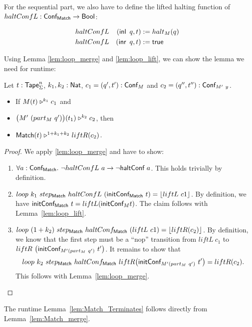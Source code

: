 For the sequential part, we also have to define the lifted halting function of \\$haltConfL : \textsf{Conf}_{\textsf{Match}} \rightarrow \textsf{Bool}$:
\begin{definition}
  \begin{alignat*}{2}
    & haltConfL & (\operatorname{\textsf{inl}}~q, t) &:= halt_M(q) \\
    & haltConfL & (\operatorname{\textsf{inr}}~q, t) &:= \textsf{true}
  \end{alignat*}
\end{definition}

Using Lemma \ref{lem:loop_merge} and \ref{lem:loop_lift}, we can show the lemma we need for runtime:
\begin{lemma}
  \label{lem:Match_merge}
  Let $t : \textsf{Tape}_\Sigma^n$, $k_1, k_2:\textsf{Nat}$, $c_1=(q', t') : \textsf{Conf}_M$ and $c_2=(q'', t'') : \textsf{Conf}_{M'~y}$.
  \begin{itemize}
  \item If $M(t) \mathrel{\triangleright}^{k_1} c_1$ and
  \item $\bigl( M'~(part_M~q') \bigr) (t_1) \mathrel{\triangleright}^{k_2} c_2$, then
  \item $\textsf{Match}(t) \mathrel{\triangleright}^{1+k_1+k_2} liftR(c_2)$.
  \end{itemize}
\end{lemma}
\begin{proof}
  We apply \ref{lem:loop_merge} and have to show:
  \begin{enumerate}
  \item $\forall a:\textsf{Conf}_{\textsf{Match}}.~ \lnot haltConfL~a \rightarrow \lnot \textsf{haltConf}~a$.  This holds trivially by definition.
  \item $loop~k_1~step_{\textsf{Match}}~haltConfL~(\textsf{initConf}_{\textsf{Match}}~t) =
    \left\lfloor {liftL~c1} \right\rfloor$.  By definition, we have $\textsf{initConf}_{\textsf{Match}}~t=liftL(\textsf{initConf}_M t)$.  The claim follows with Lemma~\ref{lem:loop_lift}.
  \item $loop~(1+k_2)~step_{\textsf{Match}}~haltConf_{\textsf{Match}}~(liftL~c1) =
    \left\lfloor {liftR(c_2)} \right\rfloor$.  By definition, we know that the first step must be a ``nop'' transition from
    $liftL~c_1$ to $liftR~\bigl(\textsf{initConf}_{M'(part_M~q')}~t' \bigr)$.
    It remains to show that
    $$ loop~k_2~step_{\textsf{Match}}~haltConf_{\textsf{Match}}~liftR \bigl(\textsf{initConf}_{M'(part_M~q')}~t' \bigr) = liftR(c_2).$$
    This follows with Lemma~\ref{lem:loop_merge}.
  \end{enumerate}
\end{proof}
The runtime Lemma~\ref{lem:Match_Terminates} follows directly from Lemma~\ref{lem:Match_merge}.

